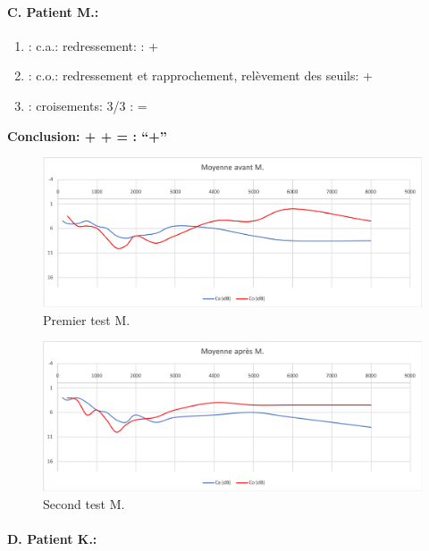                \paragraph{ C. Patient M.:}


	\begin{enumerate}

 		\item : c.a.: redressement: : +   %

 		\item : c.o.: redressement et rapprochement,
                  relèvement des seuils:  +     %
 		\item : croisements: 3/3 :  =

                \end{enumerate}

                \textbf{  Conclusion:  +  +  =     : ``+''}

                \begin{figure}
\centering
\includegraphics[width=0.7\linewidth]{images/graphiques/m_pre.png}
\caption[Moyenne OG+OD]{Premier test M.}

\end{figure}


                        \begin{figure}
\centering
\includegraphics[width=0.7\linewidth]{images/graphiques/m_post.png}
\caption[Moyenne OG+OD]{Second test M.}

\end{figure}



\paragraph{D. Patient K.:}

